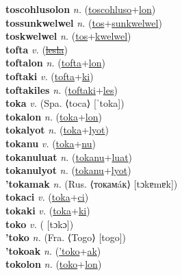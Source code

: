 \textbf{toscohlusolon} \textit{n.} (\hyperref[toscohluso]{toscohluso}+\hyperref[lon]{lon})
 \label{toscohlusolon} \\
\textbf{tossunkwelwel} \textit{n.} (\hyperref[tos]{tos}+\hyperref[sunkwelwel]{sunkwelwel})
 \label{tossunkwelwel} \\
\textbf{toskwelwel} \textit{n.} (\hyperref[tos]{tos}+\hyperref[kwelwel]{kwelwel})
 \label{toskwelwel} \\
\textbf{tofta} \textit{v.} (\hyperref[lesla]{\sout{lesla}})
 \label{tofta} \\
\textbf{toftalon} \textit{n.} (\hyperref[tofta]{tofta}+\hyperref[lon]{lon})
 \label{toftalon} \\
\textbf{toftaki} \textit{v.} (\hyperref[tofta]{tofta}+\hyperref[ki]{ki})
 \label{toftaki} \\
\textbf{toftakiles} \textit{n.} (\hyperref[toftaki]{toftaki}+\hyperref[les]{les})
 \label{toftakiles} \\
\textbf{toka} \textit{v.} (Spa. ⟨toca⟩ [ˈtoka])
 \label{toka} \\
\textbf{tokalon} \textit{n.} (\hyperref[toka]{toka}+\hyperref[lon]{lon})
 \label{tokalon} \\
\textbf{tokalyot} \textit{n.} (\hyperref[toka]{toka}+\hyperref[lyot]{lyot})
 \label{tokalyot} \\
\textbf{tokanu} \textit{v.} (\hyperref[toka]{toka}+\hyperref[nu]{nu})
 \label{tokanu} \\
\textbf{tokanuluat} \textit{n.} (\hyperref[tokanu]{tokanu}+\hyperref[luat]{luat})
 \label{tokanuluat} \\
\textbf{tokanulyot} \textit{n.} (\hyperref[tokanu]{tokanu}+\hyperref[lyot]{lyot})
 \label{tokanulyot} \\
\textbf{'tokamak} \textit{n.} (Rus. ⟨токамáк⟩ [tɔkɐmɐk])
 \label{'tokamak} \\
\textbf{tokaci} \textit{v.} (\hyperref[toka]{toka}+\hyperref[ci]{ci})
 \label{tokaci} \\
\textbf{tokaki} \textit{v.} (\hyperref[toka]{toka}+\hyperref[ki]{ki})
 \label{tokaki} \\
\textbf{toko} \textit{v.} ( [tɔkɔ])
 \label{toko} \\
\textbf{'toko} \textit{n.} (Fra. ⟨Togo⟩ [togo])
 \label{'toko} \\
\textbf{'tokoak} \textit{n.} (\hyperref['toko]{'toko}+\hyperref[ak]{ak})
 \label{'tokoak} \\
\textbf{tokolon} \textit{n.} (\hyperref[toko]{toko}+\hyperref[lon]{lon})
 \label{tokolon} \\

